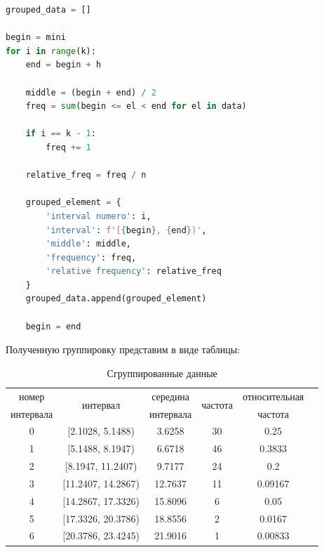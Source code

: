 \documentclass[a4paper, 14pt]{extarticle}
\begin{document}
\begin{center}
  \begin{lstlisting}[language=Python]
grouped_data = []

begin = mini
for i in range(k):
    end = begin + h

    middle = (begin + end) / 2
    freq = sum(begin <= el < end for el in data)
    
    if i == k - 1:
        freq += 1

    relative_freq = freq / n

    grouped_element = {
        'interval numero': i,
        'interval': f'[{begin}, {end})',
        'middle': middle,
        'frequency': freq,
        'relative frequency': relative_freq
    }
    grouped_data.append(grouped_element)

    begin = end
  \end{lstlisting}
\end{center}
\vspace{10pt}
Полученную группировку представим в виде таблицы:
\vspace{10pt}
\begin{table}[h!]
  \centering
  \renewcommand{\arraystretch}{1.5}
  \begin{adjustbox}{max width=0.8\textwidth}
      \begin{tabular}{|c|c|c|c|c|c|}
      \hline
      номер     & \multirow{2}{*}{интервал} & середина  & \multirow{2}{*}{частота} & относительная \\
      интервала &                           & интервала &                          & частота       \\
      \hline
      0 & [2.1028, 5.1488)   & 3.6258  & 30 & 0.25    \\
      \hline
      1 & [5.1488, 8.1947)   & 6.6718  & 46 & 0.3833  \\
      \hline
      2 & [8.1947, 11.2407)  & 9.7177  & 24 & 0.2     \\
      \hline
      3 & [11.2407, 14.2867) & 12.7637 & 11 & 0.09167 \\
      \hline
      4 & [14.2867, 17.3326) & 15.8096 & 6  & 0.05    \\
      \hline
      5 & [17.3326, 20.3786) & 18.8556 & 2  & 0.0167  \\
      \hline
      6 & [20.3786, 23.4245) & 21.9016 & 1  & 0.00833 \\
      \hline
      \end{tabular}
  \end{adjustbox}
  \caption{Сгруппированные данные}
  \label{tab:your_table_label}
\end{table}
\end{document}
